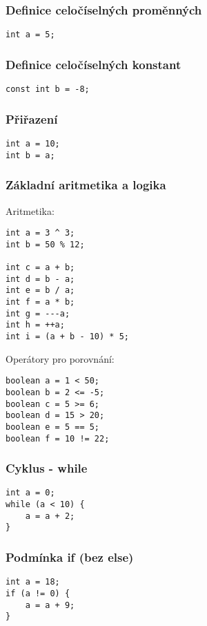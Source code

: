 \documentclass[czech, oth, kiv, he, iso690numb, viewonly]{fasthesis}
\begin{document}
\subsubsection{Definice celočíselných proměnných}
\begin{lstlisting}[]
int a = 5;
\end{lstlisting}


\subsubsection{Definice celočíselných konstant}
\begin{lstlisting}[]
const int b = -8;
\end{lstlisting}

\subsubsection{Přiřazení}
\begin{lstlisting}[]
int a = 10;
int b = a;
\end{lstlisting}

\subsubsection{Základní aritmetika a logika}
Aritmetika:
\begin{lstlisting}[]
int a = 3 ^ 3;
int b = 50 % 12;

int c = a + b;
int d = b - a;
int e = b / a;
int f = a * b;
int g = ---a; 
int h = ++a;   
int i = (a + b - 10) * 5; 
\end{lstlisting}
Operátory pro porovnání:
\begin{lstlisting}[]
boolean a = 1 < 50;
boolean b = 2 <= -5;
boolean c = 5 >= 6;
boolean d = 15 > 20;
boolean e = 5 == 5;
boolean f = 10 != 22;
\end{lstlisting}

\subsubsection{Cyklus - while}
\begin{lstlisting}[]
int a = 0;
while (a < 10) {
    a = a + 2;
}
\end{lstlisting}

\subsubsection{Podmínka if (bez else)}
\begin{lstlisting}[]
int a = 18;
if (a != 0) {
    a = a + 9;
}
\end{lstlisting}
\end{document}
